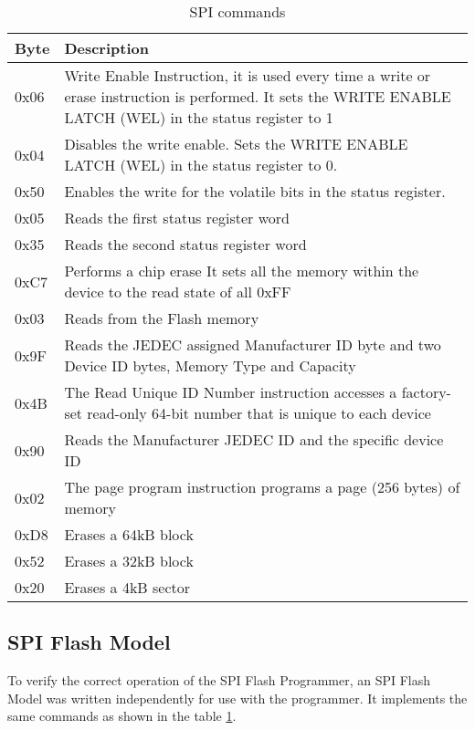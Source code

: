 \begin{table}[h!]
\centering
    \begin{tabular}{ | l | p{12cm} |}
    \hline
    Byte & Description \\ \hline
    0x06 & Write Enable Instruction, it is used every time a write or erase instruction
    is performed. It sets the WRITE ENABLE LATCH (WEL) in the status register to 1\\ \hline
    0x04 & Disables the write enable. Sets the WRITE ENABLE LATCH (WEL) in the status register to 0.\\ \hline
    0x50 & Enables the write for the volatile bits in the status register.\\ \hline
    0x05 &  Reads the first status register word \\ \hline
    0x35 &  Reads the second status register word\\ \hline
    0xC7  & Performs a chip erase It sets all the memory within the device to the read state of all 0xFF\\ \hline
    0x03 & Reads from the Flash memory\\ \hline
    0x9F & Reads the JEDEC assigned Manufacturer ID byte and two Device ID
    bytes, Memory Type and Capacity \\ \hline
    0x4B & The Read Unique ID Number instruction accesses a factory-set read-only 64-bit number that is unique to
    each device\\ \hline
    0x90 & Reads the Manufacturer JEDEC ID and the specific device ID\\ \hline
    0x02 & The page program instruction programs a page (256 bytes) of memory \\ \hline
    0xD8 & Erases a  64kB block\\ \hline
    0x52 & Erases a 32kB block\\ \hline
    0x20 & Erases a 4kB sector \\ \hline
    \end{tabular}
    \caption{SPI commands}
    \label{tab:spi_commands}
\end{table}


\subsection{SPI Flash Model}
To verify the correct operation of the SPI Flash Programmer, an SPI Flash
Model was written independently for use with the programmer. It implements the same commands as shown in the
table \ref{tab:spi_commands}.

